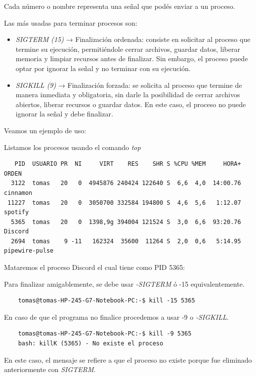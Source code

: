 \documentclass{article}
\begin{document}
\noindent
Cada número o nombre representa una señal que podés enviar a un proceso.

\noindent
Las más usadas para terminar procesos son:

\begin{itemize}
  \item \textit{SIGTERM (15)} → Finalización ordenada: consiste en solicitar al proceso que termine su ejecución, 
  permitiéndole cerrar archivos, guardar datos, liberar memoria y limpiar recursos antes de finalizar. Sin embargo, el proceso 
  puede optar por ignorar la señal y no terminar con su ejecución.
  \item \textit{SIGKILL (9)} → Finalización forzada: se solicita al proceso que termine de manera inmediata y obligatoria,
  sin darle la posibilidad de cerrar archivos abiertos, liberar recursos o guardar datos. En este caso, el proceso no puede 
  ignorar la señal y debe finalizar.
\end{itemize}

\noindent
Veamos un ejemplo de uso:

\bigbreak\noindent
Listamos los procesos usando el comando \textit{top}
   
\begin{commandline}
 {
\begin{verbatim}
   PID  USUARIO PR  NI     VIRT    RES    SHR S %CPU %MEM     HORA+ ORDEN
  3122  tomas   20   0  4945876 240424 122640 S  6,6  4,0  14:00.76 cinnamon
 11227  tomas   20   0  3050700 332584 194800 S  4,6  5,6   1:12.07 spotify
  5365  tomas   20   0  1398,9g 394004 121524 S  3,0  6,6  93:20.76 Discord
  2694  tomas    9 -11   162324  35600  11264 S  2,0  0,6   5:14.95 pipewire-pulse
\end{verbatim}
}
\end{commandline}

\noindent
Mataremos el proceso Discord el cual tiene como PID 5365:

\medskip\noindent
Para finalizar amigablemente, se debe usar \textit{-SIGTERM} ó -15 equivalentemente.
    
\begin{commandline}
  \begin{verbatim}
    tomas@tomas-HP-245-G7-Notebook-PC:-$ kill -15 5365
  \end{verbatim}
\end{commandline}

\noindent
En caso de que el programa no finalice procedemos a usar -9 o \textit{-SIGKILL}.


\begin{commandline}
  \begin{verbatim}
    tomas@tomas-HP-245-G7-Notebook-PC:-$ kill -9 5365
    bash: killK (5365) - No existe el proceso
  \end{verbatim}
\end{commandline}

\noindent
En este caso, el mensaje se refiere a que el proceso no existe porque fue eliminado anteriormente con \textit{SIGTERM}.

\end{document}
